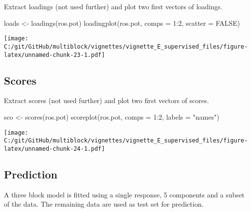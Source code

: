 \documentclass[
]{article}
\newenvironment{Shaded}{\begin{snugshade}}{\end{snugshade}}
\newcommand{\AttributeTok}[1]{\textcolor[rgb]{0.77,0.63,0.00}{#1}}
\newcommand{\ConstantTok}[1]{\textcolor[rgb]{0.00,0.00,0.00}{#1}}
\newcommand{\DecValTok}[1]{\textcolor[rgb]{0.00,0.00,0.81}{#1}}
\newcommand{\FunctionTok}[1]{\textcolor[rgb]{0.00,0.00,0.00}{#1}}
\newcommand{\NormalTok}[1]{#1}
\newcommand{\OtherTok}[1]{\textcolor[rgb]{0.56,0.35,0.01}{#1}}
\newcommand{\SpecialCharTok}[1]{\textcolor[rgb]{0.00,0.00,0.00}{#1}}
\newcommand{\StringTok}[1]{\textcolor[rgb]{0.31,0.60,0.02}{#1}}
\begin{document}
Extract loadings (not used further) and plot two first vectors of
loadings.

\begin{Shaded}
\begin{Highlighting}[]
\NormalTok{loads }\OtherTok{\textless{}{-}} \FunctionTok{loadings}\NormalTok{(ros.pot)}
\FunctionTok{loadingplot}\NormalTok{(ros.pot, }\AttributeTok{comps =} \DecValTok{1}\SpecialCharTok{:}\DecValTok{2}\NormalTok{, }\AttributeTok{scatter =} \ConstantTok{FALSE}\NormalTok{)}
\end{Highlighting}
\end{Shaded}

\texttt{[image: C:/git/GitHub/multiblock/vignettes/vignette\_E\_supervised\_files/figure-latex/unnamed-chunk-23-1.pdf]}

\hypertarget{scores-1}{%
\subsection{Scores}\label{scores-1}}

Extract scores (not used further) and plot two first vectors of scores.

\begin{Shaded}
\begin{Highlighting}[]
\NormalTok{sco }\OtherTok{\textless{}{-}} \FunctionTok{scores}\NormalTok{(ros.pot)}
\FunctionTok{scoreplot}\NormalTok{(ros.pot, }\AttributeTok{comps =} \DecValTok{1}\SpecialCharTok{:}\DecValTok{2}\NormalTok{, }\AttributeTok{labels =} \StringTok{"names"}\NormalTok{)}
\end{Highlighting}
\end{Shaded}

\texttt{[image: C:/git/GitHub/multiblock/vignettes/vignette\_E\_supervised\_files/figure-latex/unnamed-chunk-24-1.pdf]}

\hypertarget{prediction-1}{%
\subsection{Prediction}\label{prediction-1}}

A three block model is fitted using a single response, 5 components and
a subset of the data. The remaining data are used as test set for
prediction.
\end{document}

